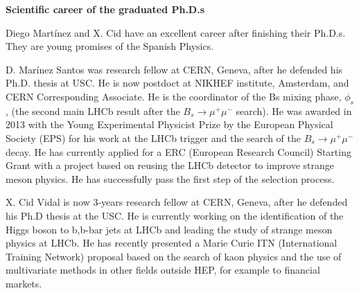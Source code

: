{\bf Scientific career of the graduated Ph.D.s}

Diego Mart\'inez and X. Cid have an excellent career after finishing their Ph.D.s. They are young promises of the Spanish Physics. 

D. Mar\'inez Santos was research fellow at CERN, Geneva, after he defended his Ph.D. thesis at USC. He is now postdoct at NIKHEF institute, Amsterdam, and CERN Corresponding Associate. He is the coordinator of the Bs mixing phase, $\phi_s$, (the second main LHCb result after the $B_s \to \mu^+\mu^-$ search). He was awarded in 2013 with the Young Experimental Physicist Prize by the European Physical Society (EPS) for his work at the LHCb trigger and the search of the $B_s \to \mu^+ \mu^-$ decay. He has currently applied for a ERC (European Research Council) Starting Grant with a project based on reusing the LHCb detector to improve strange meson physics. He has successfully pass the first step of the selection process. 

X. Cid Vidal is now 3-years research fellow at CERN, Geneva, after he defended his Ph.D thesis at the USC. He is currently working on the identification of the Higgs boson to b,b-bar jets at LHCb and leading the study of strange meson physics at LHCb. He has recently presented a Marie Curie ITN  (International Training Network) proposal based on the search of kaon physics and the use of multivariate methods in other fields outside HEP, for example to financial markets. 


